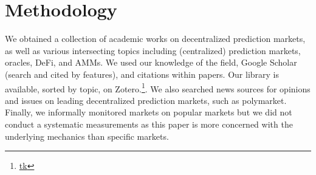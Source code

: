 \section{Methodology}

We obtained a collection of academic works on decentralized prediction markets, as well as various intersecting topics including (centralized) prediction markets, oracles, DeFi, and AMMs. We used our knowledge of the field, Google Scholar (search and cited by features), and citations within papers. Our library is available, sorted by topic, on Zotero.\footnote{\url{tk}}. We also searched news sources for opinions and issues on leading decentralized prediction markets, such as polymarket. Finally, we informally monitored markets on popular markets but we did not conduct a systematic measurements as this paper is more concerned with the underlying mechanics than specific markets.

